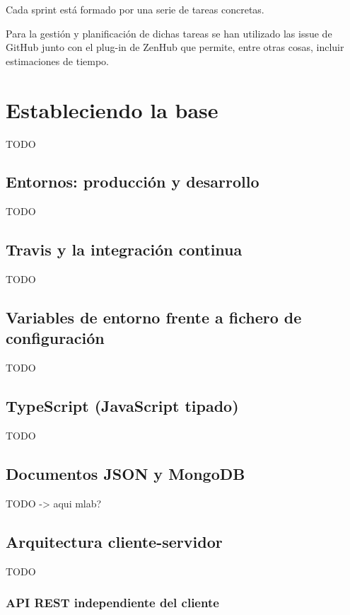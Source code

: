 Cada sprint está formado por una serie de tareas concretas.

Para la gestión y planificación de dichas tareas se han utilizado las issue de GitHub junto con el plug-in de ZenHub que permite, entre otras cosas, incluir estimaciones de tiempo.


\section{Estableciendo la base}

TODO

\subsection{Entornos: producción y desarrollo}

TODO

\subsection{Travis y la integración continua}

TODO

\subsection{Variables de entorno frente a fichero de configuración}

TODO

\subsection{TypeScript (JavaScript tipado)}

TODO

\subsection{Documentos JSON y MongoDB}

TODO -> aqui mlab?

\subsection{Arquitectura cliente-servidor}

TODO

\subsubsection{API REST independiente del cliente}


